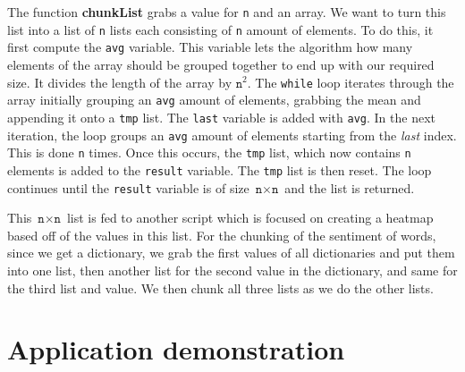 \documentclass[runningheads]{llncs}
\begin{document}
The function \textbf{chunkList} grabs a value for \texttt{n} and an array. We want to turn this list into a list of \texttt{n} lists each consisting of \texttt{n} amount of elements. To do this, it first compute the \texttt{avg} variable. This variable lets the algorithm how many elements of the array should be grouped together to end up with our required size. It divides the length of the array by $\texttt{n}^2$. The \texttt{while} loop iterates through the array initially grouping an \texttt{avg} amount of elements, grabbing the mean and appending it onto a \texttt{tmp} list. The \texttt{last} variable is added with \texttt{avg}. In the next iteration, the loop groups an \texttt{avg} amount of elements starting from the \textit{last} index. This is done \texttt{n} times. Once this occurs, the \texttt{tmp} list, which now contains \texttt{n} elements is added to the \texttt{result} variable. The \texttt{tmp} list is then reset. The loop continues until the \texttt{result} variable is of size $\texttt{n} \times \texttt{n}$ and the list is returned. 

This $\texttt{n} \times \texttt{n}$ list is fed to another script which is focused on creating a heatmap based off of the values in this list. For the chunking of the sentiment of words, since we get a dictionary, we grab the first values of all dictionaries and put them into one list, then another list for the second value in the dictionary, and same for the third list and value. We then chunk all three lists as we do the other lists. 


\section{Application demonstration}


\end{document}
